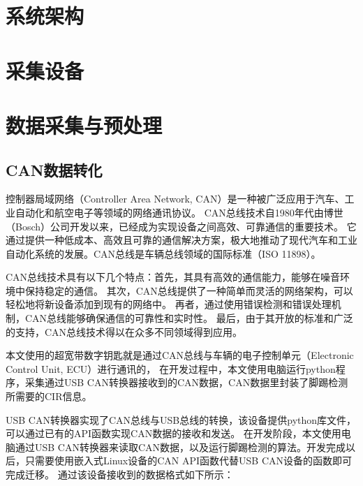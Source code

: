 \section{系统架构}

\section{采集设备}


\section{数据采集与预处理}
\subsection{CAN数据转化}
控制器局域网络（Controller Area Network, CAN）是一种被广泛应用于汽车、工业自动化和航空电子等领域的网络通讯协议。
CAN总线技术自1980年代由博世（Bosch）公司开发以来，已经成为实现设备之间高效、可靠通信的重要技术。
它通过提供一种低成本、高效且可靠的通信解决方案，极大地推动了现代汽车和工业自动化系统的发展。CAN总线是车辆总线领域的国际标准（ISO 11898）\cite{Chen2009ResearchOT}。

CAN总线技术具有以下几个特点：首先，其具有高效的通信能力，能够在噪音环境中保持稳定的通信。
其次，CAN总线提供了一种简单而灵活的网络架构，可以轻松地将新设备添加到现有的网络中。
再者，通过使用错误检测和错误处理机制，CAN总线能够确保通信的可靠性和实时性。
最后，由于其开放的标准和广泛的支持，CAN总线技术得以在众多不同领域得到应用。

本文使用的超宽带数字钥匙就是通过CAN总线与车辆的电子控制单元（Electronic Control Unit, ECU）进行通讯的，
在开发过程中，本文使用电脑运行python程序，采集通过USB CAN转换器接收到的CAN数据，CAN数据里封装了脚踢检测所需要的CIR信息。

USB CAN转换器实现了CAN总线与USB总线的转换，该设备提供python库文件，可以通过已有的API函数实现CAN数据的接收和发送。
在开发阶段，本文使用电脑通过USB CAN转换器来读取CAN数据，以及运行脚踢检测的算法。开发完成以后，只需要使用嵌入式Linux设备的CAN API函数代替USB CAN设备的函数即可完成迁移。
通过该设备接收到的数据格式如下所示：

